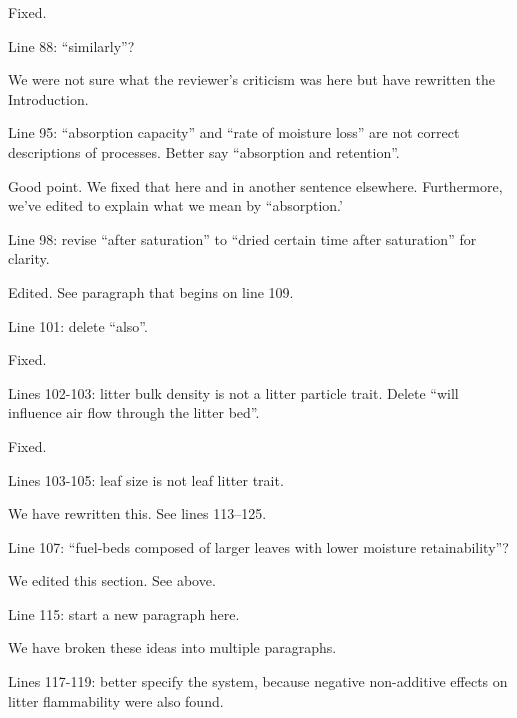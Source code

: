 \documentclass[letterpaper, 12pt]{letter}
\begin{document}
\begin{letter}{}
Fixed.

\begin{quoting}
Line 88: “similarly”?
\end{quoting}

We were not sure what the reviewer's criticism was here but have rewritten the
Introduction.

\begin{quoting}
  Line 95: “absorption capacity” and “rate of moisture loss” are not correct
  descriptions of processes. Better say “absorption and retention”.
\end{quoting}

Good point. We fixed that here and in another sentence elsewhere. Furthermore,
we've edited to explain what we mean by ``absorption.'

\begin{quoting}
  Line 98: revise “after saturation” to “dried certain time after saturation”
  for clarity.
\end{quoting}

Edited. See paragraph that begins on line 109.

\begin{quoting}
  Line 101: delete “also”.
\end{quoting}

Fixed.

\begin{quoting}
  Lines 102-103: litter bulk density is not a litter particle trait. Delete
  “will influence air flow through the litter bed”.
\end{quoting}

Fixed.

\begin{quoting}
  Lines 103-105: leaf size is not leaf litter trait.
\end{quoting}

We have rewritten this. See lines 113--125.

\begin{quoting}
  Line 107: “fuel-beds composed of larger leaves with lower moisture
  retainability”?
\end{quoting}

We edited this section. See above.

\begin{quoting}
  Line 115: start a new paragraph here.
\end{quoting}

We have broken these ideas into multiple paragraphs.

\begin{quoting}
  Lines 117-119: better specify the system, because negative non-additive
  effects on litter flammability were also found.
\end{quoting}


\end{letter}
\end{document}
